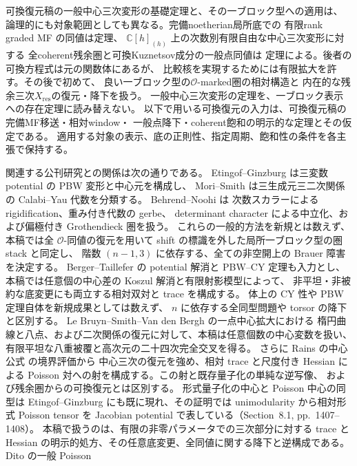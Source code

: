可換復元稿の一般中心三次変形の基礎定理と、その一ブロック型への適用は、
論理的にも対象範囲としても異なる。完備noetherian局所底での
有限rank graded MF の同値は定理、
$\mathbb C[h]_{(h)}$ 上の次数別有限自由な中心三次変形に対する
全coherent残余圏と可換Kuznetsov成分の一般点同値は
定理による。後者の可換方程式は元の関数体にあるが、
比較核を実現するためには有限拡大を許す。その後で初めて、
良い一ブロック型の$\mathcal O$-marked圏の相対構造と
内在的な残余三次$X_{\mathrm{res}}$の復元・降下を扱う。
一般中心三次変形の定理を、一ブロック表示への存在定理に読み替えない。
以下で用いる可換復元の入力は、可換復元稿の完備MF移送・相対window・
一般点降下・coherent飽和の明示的な定理とその仮定である。
適用する対象の表示、底の正則性、指定周期、飽和性の条件を各主張で保持する。

関連する公刊研究との関係は次の通りである。
Etingof--Ginzburg \cite{NFMEG} は三変数 potential の PBW 変形と中心元を構成し、
Mori--Smith \cite{MoriSmith} は三生成元三二次関係の Calabi--Yau 代数を分類する。
Behrend--Noohi \cite[Sections~2.3, 3.1.2]{NFMBehrendNoohi} は
次数スカラーによる rigidification、重み付き代数の gerbe、
determinant character による中立化、および偏極付き Grothendieck 圏を扱う。
これらの一般的方法を新規とは数えず、本稿では全 $\mathcal O$-同値の復元を用いて
shift の標識を外した局所一ブロック型の圏 stack と同定し、
階数 $(n-1,3)$ に依存する、全ての非空開上の Brauer 障害を決定する。
Berger--Taillefer \cite{NFMBeTa} の potential 解消と PBW--CY 定理も入力とし、
本稿では任意個の中心差の Koszul 解消と有限射影模型によって、
非平坦・非被約な底変更にも両立する相対双対と trace を構成する。
体上の CY 性や PBW 定理自体を新規成果としては数えず、
$n$ に依存する全同型問題や torsor の降下と区別する。
Le Bruyn--Smith--Van den Bergh \cite{LBSV} の一点中心拡大における
楕円曲線と八点、および二次関係の復元に対して、本稿は任意個数の中心変数を扱い、
有限平坦な八重被覆と高次元の二十四次完全交叉を得る。
さらに Rains の中心公式 \cite[\S9, p.~1414]{NFMEG} の境界評価から
中心三次の復元を強め、相対 trace と尺度付き Hessian による
Poisson 対への射を構成する。この射と既存量子化の単純な逆写像、
および残余圏からの可換復元とは区別する。
形式量子化の中心と Poisson 中心の同型は
Etingof--Ginzburg\cite[Proposition~8.1.1, equation~(8.1.3)]{NFMEG}
にも既に現れ、その証明では unimodularity から相対形式 Poisson tensor を
Jacobian potential で表している（Section~8.1, pp.~1407--1408）。
本稿で扱うのは、有限の非零パラメータでの三次部分に対する
trace と Hessian の明示的処方、その任意底変更、全同値に関する降下と逆構成である。
Dito\cite[Section~2, equation~(3); Section~3, Theorem~2]{NFMDito} の一般 Poisson
